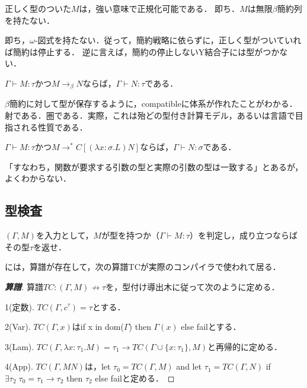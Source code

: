 \documentclass[uplatex, 12pt, dvipdfmx]{jsreport}
\begin{document}
\begin{theorem}\label{thm-strong-normalizability}
    正しく型のついた$M$は，強い意味で正規化可能である．
    即ち．$M$は無限$\beta$簡約列を持たない．
\end{theorem}
\begin{remark}
    即ち，$\omega$-図式を持たない．従って，簡約戦略に依らずに，正しく型がついていれば簡約は停止する．
    逆に言えば，簡約の停止しないY結合子には型がつかない．
\end{remark}

\begin{theorem}\label{thm-subject-reduction-theorem}
    $\Gamma\vdash M:\tau$かつ$M\to_\beta N$ならば，$\Gamma\vdash N:\tau$である．
\end{theorem}
\begin{remark}
    $\beta$簡約に対して型が保存するように，compatibleに体系が作れたことがわかる．射である．圏である．実際，これは殆どの型付き計算モデル，あるいは言語で目指される性質である．
\end{remark}
\begin{corollary}
    $\Gamma\vdash M:\tau$かつ$M\to^* C[(\lambda x:\sigma.L)N]$ならば，$\Gamma\vdash N:\sigma$である．
\end{corollary}
\begin{remark}
    「すなわち，関数が要求する引数の型と実際の引数の型は一致する」とあるが，よくわからない．
\end{remark}

\subsection{型検査}
\begin{question*}
    $(\Gamma,M)$を入力として，$M$が型を持つか（$\Gamma\vdash M:\tau$）を判定し，成り立つならばその型$\tau$を返せ．
\end{question*}
には，算譜が存在して，次の算譜TCが実際のコンパイラで使われて居る．
\begin{proof}[\textbf{算譜}]
    算譜$TC:(\Gamma,M)\nrightarrow\tau$を，型付け導出木に従って次のように定める．

    1(定数). $TC(\Gamma,c^\tau)=\tau$とする．

    2(Var). $TC(\Gamma,x)$はif x in dom($\Gamma$) then $\Gamma(x)$ else failとする．

    3(Lam). $TC(\Gamma,\lambda x:\tau_1.M)=\tau_1\to TC(\Gamma\cup\{x:\tau_1\},M)$と再帰的に定める．

    4(App). $TC(\Gamma,MN)$は，let $\tau_0=TC(\Gamma,M)$ and let $\tau_1=TC(\Gamma,N)$ if $\exists\tau_2\;\tau_0=\tau_1\to\tau_2$ then $\tau_2$ else failと定める．
\end{proof}
\end{document}

